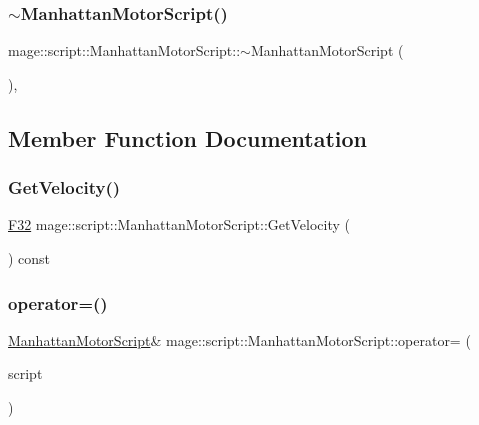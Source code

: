\subsubsection{\texorpdfstring{$\sim$\+Manhattan\+Motor\+Script()}{~ManhattanMotorScript()}}
{\footnotesize\ttfamily mage\+::script\+::\+Manhattan\+Motor\+Script\+::$\sim$\+Manhattan\+Motor\+Script (\begin{DoxyParamCaption}{ }\end{DoxyParamCaption})\hspace{0.3cm}{\ttfamily [virtual]}, {\ttfamily [default]}}



\subsection{Member Function Documentation}
\hypertarget{classmage_1_1script_1_1_manhattan_motor_script_a2f73545bf2fb507375251d530054ac9b}{}\label{classmage_1_1script_1_1_manhattan_motor_script_a2f73545bf2fb507375251d530054ac9b} 
\subsubsection{\texorpdfstring{Get\+Velocity()}{GetVelocity()}}
{\footnotesize\ttfamily \hyperlink{namespacemage_aa97e833b45f06d60a0a9c4fc22ae02c0}{F32} mage\+::script\+::\+Manhattan\+Motor\+Script\+::\+Get\+Velocity (\begin{DoxyParamCaption}{ }\end{DoxyParamCaption}) const\hspace{0.3cm}{\ttfamily [noexcept]}}

\hypertarget{classmage_1_1script_1_1_manhattan_motor_script_a7a6280230faa4d42a141e1d7768bcd0d}{}\label{classmage_1_1script_1_1_manhattan_motor_script_a7a6280230faa4d42a141e1d7768bcd0d} 
\subsubsection{\texorpdfstring{operator=()}{operator=()}\hspace{0.1cm}{\footnotesize\ttfamily [1/2]}}
{\footnotesize\ttfamily \hyperlink{classmage_1_1script_1_1_manhattan_motor_script}{Manhattan\+Motor\+Script}\& mage\+::script\+::\+Manhattan\+Motor\+Script\+::operator= (\begin{DoxyParamCaption}\item[{const \hyperlink{classmage_1_1script_1_1_manhattan_motor_script}{Manhattan\+Motor\+Script} \&}]{script }\end{DoxyParamCaption})\hspace{0.3cm}{\ttfamily [delete]}}

